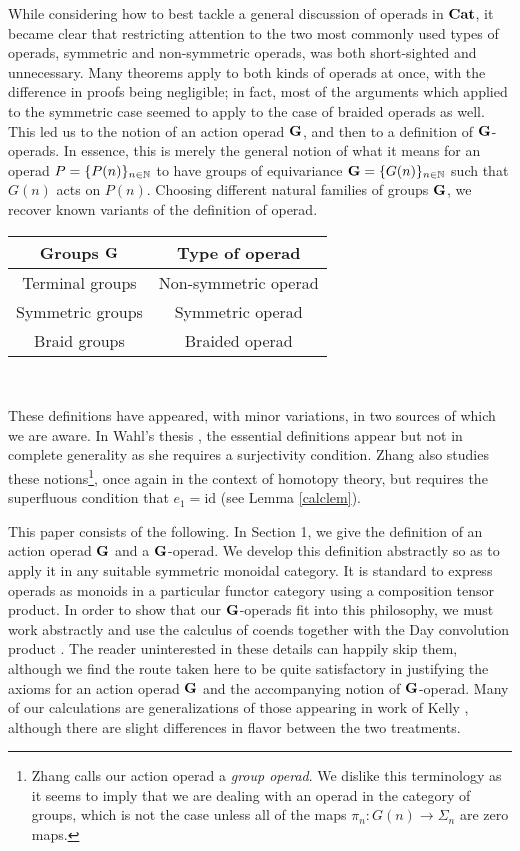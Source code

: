 While considering how to best tackle a general discussion of operads in $\mathbf{Cat}$, it became clear that restricting attention to the two most commonly used types of operads, symmetric and non-symmetric operads, was both short-sighted and unnecessary.  Many theorems apply to both kinds of operads at once, with the difference in proofs being negligible; in fact, most of the arguments which applied to the symmetric case seemed to apply to the case of braided operads as well.   This led us to the notion of an action operad $\mathbf{G}$, and then to a definition of $\mathbf{G}$-operads.  In essence, this is merely the general notion of what it means for an operad $P = \{ P(n) \}_{n \in \mathbb{N}}$ to have groups of equivariance $\mathbf{G} = \{ G(n) \}_{n \in \mathbb{N}}$ such that $G(n)$ acts on $P(n)$.  Choosing different natural families of groups $\mathbf{G}$, we recover known variants of the definition of operad. \\ \begin{center}
\begin{tabular}{c|c}
Groups $\mathbf{G}$ & Type of operad  \\ \hline
Terminal groups & Non-symmetric operad \\
Symmetric groups & Symmetric operad \\
Braid groups & Braided operad \\
\end{tabular} \\ \end{center}
These definitions have appeared, with minor variations, in two sources of which we are aware.  In Wahl's thesis \cite{wahl-thesis}, the essential definitions appear but not in complete generality as she requires a surjectivity condition.  Zhang \cite{zhang-grp} also studies these notions\footnote{Zhang calls our action operad a \textit{group operad}.  We dislike this terminology as it seems to imply that we are dealing with an operad in the category of groups, which is not the case unless all of the maps $\pi_{n}:G(n) \rightarrow \Sigma_{n}$ are zero maps.}, once again in the context of homotopy theory, but requires the  superfluous condition that $e_{1} = \textrm{id}$ (see Lemma \ref{calclem}).

This paper consists of the following.  In Section 1, we give the definition of an action operad $\mathbf{G}$ and a $\mathbf{G}$-operad.  We develop this definition abstractly so as to apply it in any suitable symmetric monoidal category.   It is standard to express operads as monoids in a particular functor category using a composition tensor product.  In order to show that our $\mathbf{G}$-operads fit into this philosophy, we must work abstractly and use the calculus of coends together with the Day convolution product \cite{day-thesis}.  The reader uninterested in these details can happily skip them, although we find the route taken here to be quite satisfactory in justifying the axioms for an action operad $\mathbf{G}$ and the accompanying notion of $\mathbf{G}$-operad.  Many of our calculations are generalizations of those appearing in work of Kelly \cite{kelly-op}, although there are slight differences in flavor between the two treatments.

